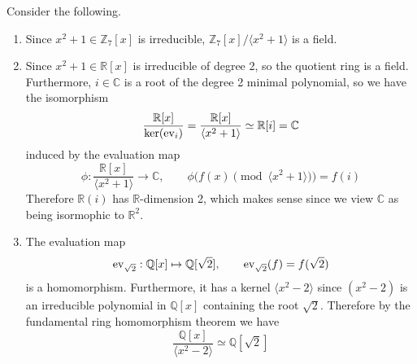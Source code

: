   \begin{example}
    Consider the following. 
    \begin{enumerate}
      \item Since $x^2 + 1 \in \mathbb{Z}_7 [x]$ is irreducible, $\mathbb{Z}_7 [x] / \langle x^2 + 1 \rangle$ is a field. 

      \item Since $x^2 + 1 \in \mathbb{R}[x]$ is irreducible of degree 2, so the quotient ring is a field. Furthermore, $i \in \mathbb{C}$ is a root of the degree 2 minimal polynomial, so we have the isomorphism 
      \begin{equation}
        \frac{\mathbb{R}[x]}{\ker(\operatorname{ev}_i)} = \frac{\mathbb{R}[x]}{\langle x^2 + 1 \rangle} \simeq \mathbb{R}[i] = \mathbb{C}
      \end{equation}
      induced by the evaluation map
      \begin{equation}
        \phi: \frac{\mathbb{R}[x]}{\langle x^2 + 1 \rangle} \rightarrow \mathbb{C}, \qquad \phi\big( f(x) \pmod{\langle x^2 + 1 \rangle} \big) = f(i)
      \end{equation}
      Therefore $\mathbb{R}(i)$ has $\mathbb{R}$-dimension 2, which makes sense since we view $\mathbb{C}$ as being isormophic to $\mathbb{R}^2$. 

      \item The evaluation map 
      \begin{equation}
        \operatorname{ev}_{\sqrt{2}}: \mathbb{Q}[x] \mapsto \mathbb{Q}[\sqrt{2}], \qquad \operatorname{ev}_{\sqrt{2}} (f) = f(\sqrt{2}) 
      \end{equation}
      is a homomorphism. Furthermore, it has a kernel $\langle x^2 - 2 \rangle$ since $(x^2 - 2)$ is an irreducible polynomial in $\mathbb{Q}[x]$ containing the root $\sqrt{2}$. Therefore by the fundamental ring homomorphism theorem we have 
      \begin{equation}
        \frac{\mathbb{Q}[x]}{\langle x^2 - 2 \rangle} \simeq \mathbb{Q}[\sqrt{2}]
      \end{equation}
    \end{enumerate}
  \end{example}

